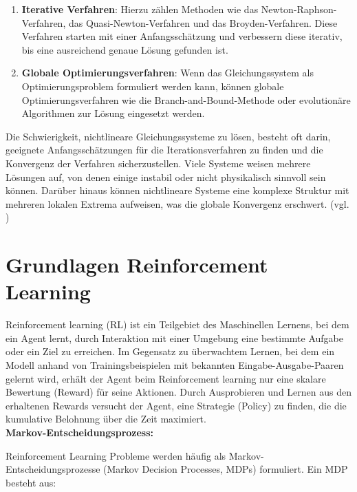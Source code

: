 \documentclass{article}
\theoremstyle{newline}
\begin{document}
\begin{onehalfspace}
\begin{enumerate}
	\item \textbf{Iterative Verfahren}: Hierzu zählen Methoden wie das Newton-Raphson-Verfahren, das Quasi-Newton-Verfahren und das Broyden-Verfahren. Diese Verfahren starten mit einer Anfangsschätzung und verbessern diese iterativ, bis eine ausreichend genaue Lösung gefunden ist.
	
	\item \textbf{Globale Optimierungsverfahren}: Wenn das Gleichungssystem als Optimierungsproblem formuliert werden kann, können globale Optimierungsverfahren wie die Branch-and-Bound-Methode oder evolutionäre Algorithmen zur Lösung eingesetzt werden.
\end{enumerate}

Die Schwierigkeit, nichtlineare Gleichungssysteme zu lösen, besteht oft darin, geeignete Anfangsschätzungen für die Iterationsverfahren zu finden und die Konvergenz der Verfahren sicherzustellen. Viele Systeme weisen mehrere Lösungen auf, von denen einige instabil oder nicht physikalisch sinnvoll sein können. Darüber hinaus können nichtlineare Systeme eine komplexe Struktur mit mehreren lokalen Extrema aufweisen, was die globale Konvergenz erschwert. (vgl. \cite{Mainzer1999})


\section{Grundlagen Reinforcement Learning}

Reinforcement learning (RL) ist ein Teilgebiet des Maschinellen Lernens, bei dem ein Agent lernt, durch Interaktion mit einer Umgebung eine bestimmte Aufgabe oder ein Ziel zu erreichen. Im Gegensatz zu überwachtem Lernen, bei dem ein Modell anhand von Trainingsbeispielen mit bekannten Eingabe-Ausgabe-Paaren gelernt wird, erhält der Agent beim Reinforcement learning nur eine skalare Bewertung (Reward) für seine Aktionen. Durch Ausprobieren und Lernen aus den erhaltenen Rewards versucht der Agent, eine Strategie (Policy) zu finden, die die kumulative Belohnung über die Zeit maximiert.
\\

\textbf{Markov-Entscheidungsprozess:}
\smallskip

Reinforcement Learning Probleme werden häufig als Markov-Entscheidungsprozesse (Markov Decision Processes, MDPs) formuliert. Ein MDP besteht aus:


\end{onehalfspace}
\end{document}
